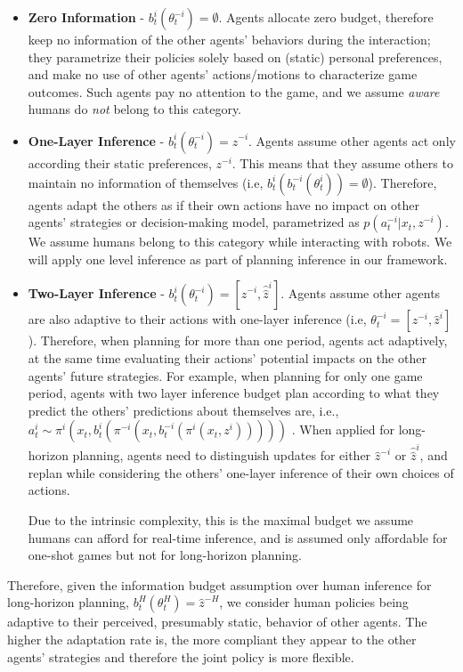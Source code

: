 \documentclass[letterpaper, 10 pt, conference]{ieeeconf}  %
\begin{document}
\begin{itemize}
	\item \textbf{Zero Information} - $b^i_t(\theta^{-i}_t) = \emptyset$. Agents allocate zero budget, therefore keep no information of the other agents' behaviors during the interaction; they 
    parametrize their policies solely based on (static) personal preferences, and make no use of other agents' actions/motions to characterize game outcomes. Such agents pay no attention to the game, and we assume \textit{aware} humans do \textit{not} belong to this category.
	\item \textbf{One-Layer Inference} - $b^i_t(\theta^{-i}_t) = \hat{z}^{-i}$. 
    Agents assume other agents act only according their static 
    preferences, $z^{-i}$. This means that they assume others to maintain no information of themselves (i.e, $b^i_t(b^{-i}_t(\theta^i_t))=\emptyset$).  
    Therefore, agents adapt the others as if their own actions have no 
    impact on other agents' strategies or decision-making model, parametrized 
    as 
    $p(a^{-i}_{t}|x_t, z^{-i})$. We assume humans belong to this 
    category while interacting with robots. We will apply one level inference as part of planning inference in our framework.
	\item \textbf{Two-Layer Inference} - $b^i_t(\theta^{-i}_t) = [\hat{z}^{-i}, \hat{\hat{z}}^i]$. Agents assume other agents are also adaptive to their actions with one-layer inference (i.e,
	$\theta^{-i}_t = [z^{-i}, \hat{z}^{i}]$). 
    Therefore, when planning for more than one period, agents act adaptively, 
    at the same time evaluating their actions' potential impacts on the 
    other agents' future strategies. For example, when planning for only one game period, 
    agents with two layer inference budget plan according to 
    what they 
    predict the others' predictions about themselves are, i.e.,
    $a^i_t \sim \pi^i(x_t, b^i_t(\pi^{-i}(x_t,b^{-i}_t(\pi^i(x_t,{z}^i)))))$
    . When applied for long-horizon planning, agents need to distinguish 
    updates for either $\hat{z}^{-i}$ or $\hat{\hat{z}}^i$, and replan while 
    considering the others' one-layer inference of their own choices of 
    actions. 
    
    Due to the intrinsic complexity, this is the maximal budget we assume 
    humans can afford for real-time inference, and is assumed only 
    affordable for one-shot games but not for long-horizon planning. 
\end{itemize}

Therefore, given the information budget assumption over human inference for long-horizon 
planning, $b^H_t(\theta^H_t) = \hat{z}^{-H}$, we consider human policies 
being adaptive to their perceived, presumably static, behavior of other 
agents. The higher the adaptation rate is, the more compliant they 
appear to the other agents' strategies and therefore the joint policy is more flexible. 
\end{document}
